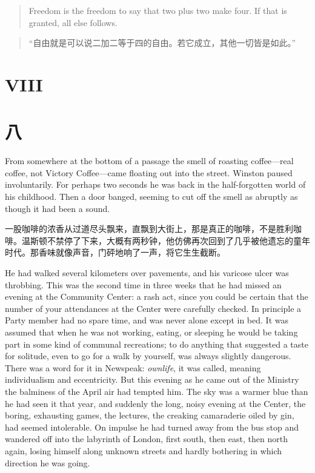 \begin{paracol}{2}
\switchcolumn*

\begin{quotation}
Freedom is the freedom to say that two plus two make four. If that
is granted, all else follows.
\end{quotation}

\switchcolumn

\begin{quotation}
  ``自由就是可以说二加二等于四的自由。若它成立，其他一切皆是如此。''
\end{quotation}

\switchcolumn*


\section{VIII}\label{viii}

\switchcolumn

\section*{八}\label{ux516b}

\switchcolumn*

From somewhere at the bottom of a passage the smell of roasting
coffee---real coffee, not Victory Coffee---came floating out into the
street. Winston paused involuntarily. For perhaps two seconds he was
back in the half-forgotten world of his childhood. Then a door banged,
seeming to cut off the smell as abruptly as though it had been a sound.

\switchcolumn

一股咖啡的浓香从过道尽头飘来，直飘到大街上，那是真正的咖啡，不是胜利咖啡。温斯顿不禁停了下来，大概有两秒钟，他仿佛再次回到了几乎被他遗忘的童年时代。那香味就像声音，门砰地响了一声，将它生生截断。

\switchcolumn*

He had walked several kilometers over pavements, and his varicose ulcer
was throbbing. This was the second time in three weeks that he had
missed an evening at the Community Center: a rash act, since you could
be certain that the number of your attendances at the Center were
carefully checked. In principle a Party member had no spare time, and
was never alone except in bed. It was assumed that when he was not
working, eating, or sleeping he would be taking part in some kind of
communal recreations; to do anything that suggested a taste for
solitude, even to go for a walk by yourself, was always slightly
dangerous. There was a word for it in Newspeak: \emph{ownlife}, it was
called, meaning individualism and eccentricity. But this evening as he
came out of the Ministry the balminess of the April air had tempted him.
The sky was a warmer blue than he had seen it that year, and suddenly
the long, noisy evening at the Center, the boring, exhausting games, the
lectures, the creaking camaraderie oiled by gin, had seemed intolerable.
On impulse he had turned away from the bus stop and wandered off into
the labyrinth of London, first south, then east, then north again,
losing himself along unknown streets and hardly bothering in which
direction he was going.


\end{paracol}
